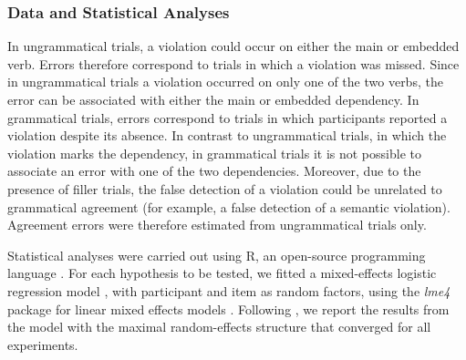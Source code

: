 \subsubsection{Data and Statistical Analyses}
In ungrammatical trials, a violation could occur on either the main or embedded verb. Errors therefore correspond to trials in which a violation was missed. Since in ungrammatical trials a violation occurred on only one of the two verbs, the error can be associated with either the main or embedded dependency. In grammatical trials, errors correspond to trials in which participants reported a violation despite its absence. In contrast to ungrammatical trials, in which the violation marks the dependency, in grammatical trials it is not possible to associate an error with one of the two dependencies. Moreover, due to the presence of filler trials, the false detection of a violation could be unrelated to grammatical agreement (for example, a false detection of a semantic violation). Agreement errors were therefore estimated from ungrammatical trials only.

Statistical analyses were carried out using R, an open-source programming language \citep{team2013r}. For each hypothesis to be tested, we fitted a mixed-effects logistic regression model \citep{jaeger2008categorical}, with participant and item as random factors, using the \textit{lme4} package for linear mixed effects models \citep{bates2015lme4}. Following \citet{Baayen:etal:2008}, we report the results from the model with the maximal random-effects structure that converged for all experiments. 